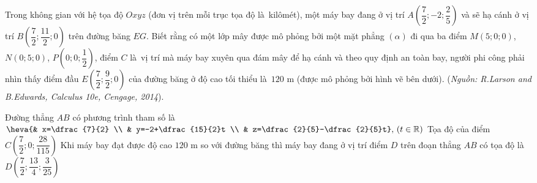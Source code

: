 \begin{ex}%
	Trong không gian với hệ tọa độ $Oxyz$ (đơn vị trên mỗi trục tọa độ là~kilômét), một máy bay đang ở vị trí $A\left( \dfrac {7}{2};-2;\dfrac {2}{5} \right)$ và sẽ hạ cánh ở vị trí $B\left( \dfrac {7}{2};\dfrac {11}{2};0 \right)$ trên đường băng $EG$. Biết rằng có một lớp mây được mô phỏng bởi một mặt phẳng $(\alpha)$ đi qua ba điểm $M\left(5;0;0 \right)$, $N\left(0;5;0\right)$, $P\left(0;0;\dfrac {1}{2} \right)$, điểm $C$ là~vị trí mà máy bay xuyên qua đám mây để hạ cánh và theo quy định an toàn bay, người phi công phải nhìn thấy điểm đầu $E\left(\dfrac {7}{2};\dfrac {9}{2};0 \right)$  của đường băng ở độ cao tối thiểu là~$120$ m (được mô phỏng bởi hình vẽ bên dưới). (\textit{Nguồn: R.Larson and B.Edwards, Calculus 10e, Cengage, 2014}).
	\begin{center}
	\end{center}
	 \choiceTF
		{\True Đường  thẳng $AB$ có phương trình tham số là~$\heva{& x=\dfrac {7}{2} \\ & y=-2+\dfrac {15}{2}t \\ & z=\dfrac {2}{5}-\dfrac {2}{5}t},\,( t\in \mathbb{R})$}
		{Tọa độ của điểm $C\left( \dfrac {7}{2};0;\dfrac {28}{115} \right)  $}
		{\True Khi máy bay đạt được độ cao $120$ m so với đường băng thì máy bay đang ở vị trí điểm $D$ trên đoạn  thẳng $AB$ có tọa độ là~$D\left( \dfrac {7}{2};\dfrac {13}{4};\dfrac {3}{25} \right) $}

\end{ex}
